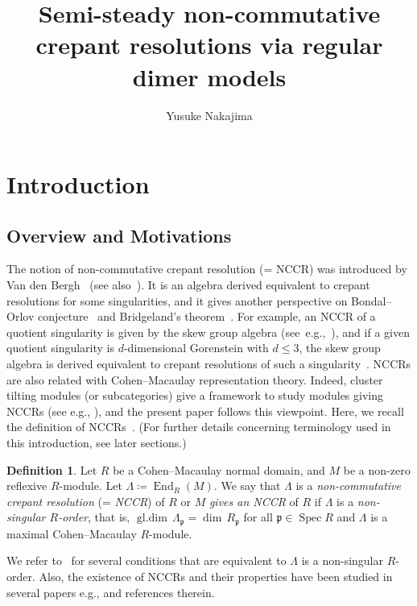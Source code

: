 \documentclass[11pt]{amsart}
\title{Semi-steady non-commutative crepant resolutions via regular dimer models}
\author{Yusuke Nakajima}
\date{}
\theoremstyle{definition}
\newtheorem{defi}[theo]{Definition}
\newcommand{\fkp}{\mathfrak{p}}
\DeclareMathOperator{\Spec}{Spec}
\DeclareMathOperator{\End}{End}
\DeclareMathOperator{\gldim}{gl.dim}
\begin{document}
\maketitle
\section{Introduction}

\subsection{Overview and Motivations}

The notion of non-commutative crepant resolution (= NCCR) was introduced by Van den Bergh~\cite{VdB2} (see also~\cite{VdB1}). It is an algebra derived equivalent to crepant resolutions for some singularities, and it gives another perspective on Bondal--Orlov conjecture~\cite{BO} and Bridgeland's theorem~\cite{Bri}. For example, an NCCR of a quotient singularity is given by the skew group algebra (see~e.g.,~\cite{Iya,IW2,VdB2}), and if a given quotient singularity is $d$-dimensional Gorenstein with $d\le 3$, the skew group algebra is derived equivalent to crepant resolutions of such a singularity~\cite{BKR,KV}. NCCRs are also related with Cohen--Macaulay representation theory. Indeed, cluster tilting modules (or subcategories) give a framework to study modules giving NCCRs (see e.g., \cite{DH,Iya,IR,IW2,IW4}), and the present paper follows this viewpoint. Here, we recall the definition of NCCRs~\cite{VdB2}. (For further details concerning terminology used in this introduction, see later sections.)

\begin{defi}\label{NCCR_def}
Let $R$ be a Cohen--Macaulay normal domain, and $M$ be a non-zero reflexive $R$-module. Let $\Lambda\coloneqq\End_R(M)$. We say that $\Lambda$ is a \emph{non-commutative crepant resolution} (= \emph{NCCR}) of $R$ or $M$ \emph{gives an NCCR} of $R$ if $\Lambda$ is a \emph{non-singular $R$-order}, that is, $\gldim\,\Lambda_\fkp=\dim\,R_\fkp$ for all $\fkp\in\Spec R$ and $\Lambda$ is a maximal Cohen--Macaulay $R$-module.
\end{defi}

We refer to~\cite[Proposition~2.17]{IW2} for several conditions that are equivalent to $\Lambda$ is a non-singular $R$-order. Also, the existence of NCCRs and their properties have been studied in several papers e.g., \cite{Bro,BLVdB,BIKR,Dao,DFI,HN,IU2,IW1,IW2,IW4,Leu2,SpVdB,Wem} and references therein.
\end{document}
